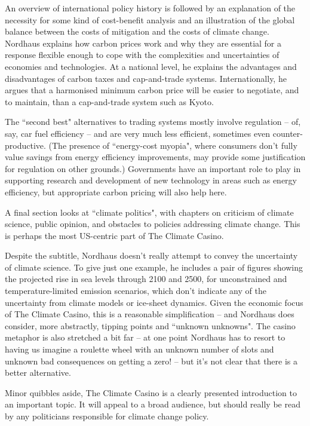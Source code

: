An overview of international policy history is followed by an explanation of the necessity for some kind of cost-benefit analysis and an illustration of the global balance between the costs of mitigation and the costs of climate change. Nordhaus explains how carbon prices work and why they are essential for a response flexible enough to cope with the complexities and uncertainties of economies and technologies. At a national level, he explains the advantages and disadvantages of carbon taxes and cap-and-trade systems. Internationally, he argues that a harmonised minimum carbon price will be easier to negotiate, and to maintain, than a cap-and-trade system such as Kyoto. 

The ``second best" alternatives to trading systems mostly involve regulation -- of, say, car fuel efficiency -- and are very much less efficient, sometimes even counter-productive. (The presence of ``energy-cost myopia", where consumers don't fully value savings from energy efficiency improvements, may provide some justification for regulation on other grounds.) Governments have an important role to play in supporting research and development of new technology in areas such as energy efficiency, but appropriate carbon pricing will also help here. 

A final section looks at ``climate politics", with chapters on criticism of climate science, public opinion, and obstacles to policies addressing climate change. This is perhaps the most US-centric part of The Climate Casino. 

Despite the subtitle, Nordhaus doesn't really attempt to convey the uncertainty of climate science. To give just one example, he includes a pair of figures showing the projected rise in sea levels through 2100 and 2500, for unconstrained and temperature-limited emission scenarios, which don't indicate any of the uncertainty from climate models or ice-sheet dynamics. Given the economic focus of The Climate Casino, this is a reasonable simplification -- and Nordhaus does consider, more abstractly, tipping points and ``unknown unknowns". The casino metaphor is also stretched a bit far -- at one point Nordhaus has to resort to having us imagine a roulette wheel with an unknown number of slots and unknown bad consequences on getting a zero! -- but it's not clear that there is a better alternative. 

Minor quibbles aside, The Climate Casino is a clearly presented introduction to an important topic. It will appeal to a broad audience, but should really be read by any politicians responsible for climate change policy.
